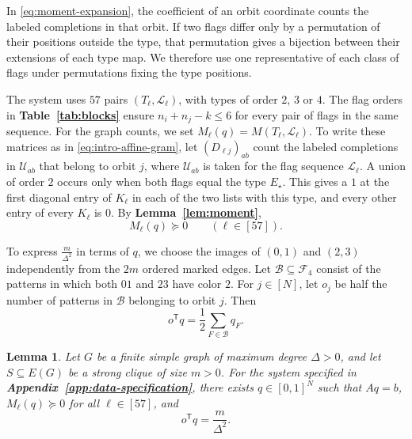 \documentclass[preprint,11pt,numbers]{elsarticle-arxiv}
\numberwithin{equation}{section}
\newtheorem{lemma}[theorem]{Lemma}
\theoremstyle{definition}
\begin{document}
In \eqref{eq:moment-expansion}, the coefficient of an orbit coordinate
counts the labeled completions in that orbit. If two flags differ
only by a permutation of their positions outside the type, that
permutation gives a bijection between their extensions of each
type map. We therefore use one representative of each class of
flags under permutations fixing the type positions.

The system uses $57$ pairs $(T_\ell,\mathcal L_\ell)$, with types of
order $2$, $3$ or $4$. The flag orders in
\textbf{Table~\ref{tab:blocks}} ensure $n_i+n_j-k\leq6$ for every
pair of flags in the same sequence. For the graph counts, we set
$M_\ell(q)=M(T_\ell,\mathcal L_\ell)$. To write these matrices as in
\eqref{eq:intro-affine-gram}, let $(D_{\ell j})_{ab}$ count the labeled
completions in $\mathcal U_{ab}$ that belong to orbit $j$, where
$\mathcal U_{ab}$ is taken for the flag sequence $\mathcal L_\ell$.
A union of order $2$ occurs only when both flags equal the type
$E_\star$. This gives a $1$ at the first diagonal entry of $K_\ell$
in each of the two lists with this type, and every other entry of
every $K_\ell$ is $0$. By \textbf{Lemma~\ref{lem:moment}},
\begin{equation}\label{eq:positive-moments}
 M_\ell(q)\succeq0\qquad(\ell\in[57]).
\end{equation}

To express $\frac{m}{\Delta^2}$ in terms of $q$, we choose the
images of $(0,1)$ and $(2,3)$ independently from the $2m$ ordered
marked edges. Let $\mathcal B\subseteq\mathcal F_4$ consist of the
patterns in which both $01$ and $23$ have color $2$. For $j\in[N]$,
let $o_j$ be half the number of patterns in $\mathcal B$ belonging
to orbit $j$. Then
\begin{equation}\label{eq:objective-vector}
 o^{\mathsf T}q=\frac{1}{2}\sum_{F\in\mathcal B}q_F.
\end{equation}

\begin{lemma}\label{lem:finite-encoding}\label{lem:objective}
Let $G$ be a finite simple graph of maximum degree $\Delta>0$, and
let $S\subseteq E(G)$ be a strong clique of size $m>0$. For the system
specified in \textbf{Appendix~\ref{app:data-specification}}, there exists
$q\in[0,1]^N$ such that $Aq=b$, $M_\ell(q)\succeq0$ for all
$\ell\in[57]$, and
\begin{equation}\label{eq:objective-value}
 o^{\mathsf T}q=\frac{m}{\Delta^2}.
\end{equation}
\end{lemma}
\end{document}
